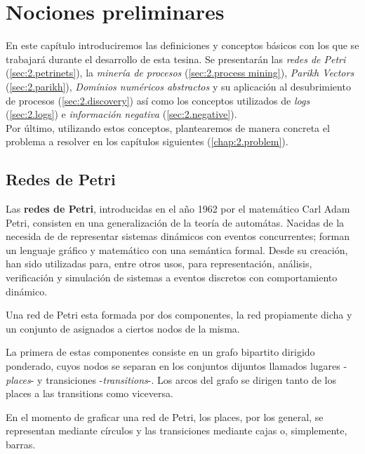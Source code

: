 \chapter[Nociones preliminares]{Nociones preliminares}
\label{chap:2}

En este capítulo introduciremos las definiciones y conceptos básicos con los que se trabajará durante el desarrollo de esta tesina. Se presentarán las \textit{redes de Petri} (\autoref{sec:2.petrinets}), la \textit{minería de procesos} (\autoref{sec:2.process mining}), \textit{Parikh Vectors} (\autoref{sec:2.parikh}),
\textit{Domínios numéricos abstractos} y su aplicación al desubrimiento de procesos (\autoref{sec:2.discovery}) así como los conceptos utilizados de \textit{logs} (\autoref{sec:2.logs}) e \textit{información negativa} (\autoref{sec:2.negative}).
\\

Por último, utilizando estos conceptos, plantearemos de manera concreta el problema a resolver en los capítulos siguientes (\autoref{chap:2.problem}).

\section{Redes de Petri}
\label{sec:2.petrinets}
Las \textbf{redes de Petri}, introducidas en el año 1962 por el matemático
Carl Adam Petri, consisten en una generalización de la teoría de automátas.
Nacidas de la necesida de de representar sistemas dinámicos con eventos concurrentes;
forman un lenguaje gráfico y matemático con una semántica formal.
Desde su creación, han sido utilizadas para, entre otros usos, para representación,
análisis, verificación y simulación de sistemas a eventos discretos con comportamiento dinámico\cite{Murata89}.

Una red de Petri esta formada por dos componentes, la red propiamente dicha y un conjunto
de  asignados a ciertos nodos de la misma.

La primera de estas componentes consiste en un grafo bipartito dirigido ponderado,
cuyos nodos se separan en los conjuntos dijuntos 
llamados lugares -\textit{places}- y transiciones -\textit{transitions}-.
Los arcos del grafo se dirigen tanto de los places a las transitions como viceversa.

En el momento de graficar una red de Petri, los places, por los general, se
representan mediante círculos y las transiciones mediante cajas o, simplemente, barras.

